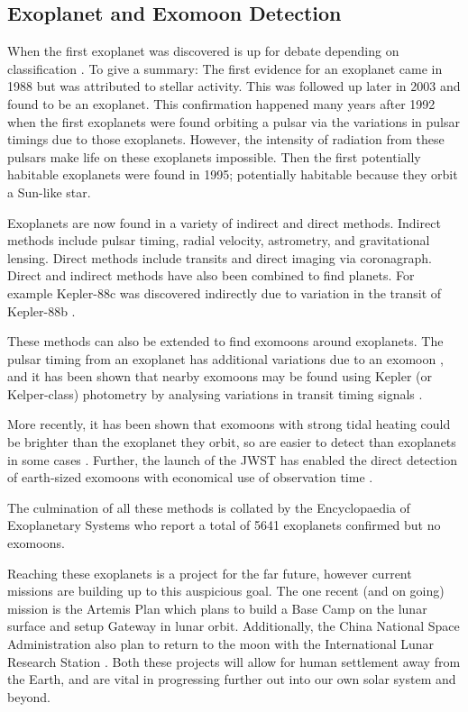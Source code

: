 \documentclass[12pt, onecolumn]{revtex4-2}    %
\begin{document}
\subsection{Exoplanet and Exomoon Detection} \label{ssec:ExoplanetExomoonDetection}
%
When the first exoplanet was discovered is up for debate depending on classification \cite{ESA_2019}.
To give a summary:
The first evidence for an exoplanet came in 1988 but was attributed to stellar activity.
This was followed up later in 2003 and found to be an exoplanet.
This confirmation happened many years after 1992 when the first exoplanets were found orbiting a pulsar via the variations in pulsar timings due to those exoplanets.
However, the intensity of radiation from these pulsars make life on these exoplanets impossible.
Then the first potentially habitable exoplanets were found in 1995; potentially habitable because they orbit a Sun-like star.

Exoplanets are now found in a variety of indirect and direct methods.
Indirect methods include pulsar timing, radial velocity, astrometry, and gravitational lensing.
Direct methods include transits and direct imaging via coronagraph.
Direct and indirect methods have also been combined to find planets. 
For example Kepler-88c was discovered indirectly due to variation in the transit of Kepler-88b \cite{Nesvorny2013}.

These methods can also be extended to find exomoons around exoplanets.
The pulsar timing from an exoplanet has additional variations due to an exomoon \cite{Lewis2008}, and it has been shown that nearby exomoons may be found using Kepler (or Kelper-class) photometry by analysing variations in transit timing signals \cite{KSG2009}.

More recently, it has been shown that exomoons with strong tidal heating could be brighter than the exoplanet they orbit, so are easier to detect than exoplanets in some cases \cite{LimTurn2013}.
Further, the launch of the JWST has enabled the direct detection of earth-sized exomoons with economical use of observation time \cite{Limbach2021}.

The culmination of all these methods is collated by the Encyclopaedia of Exoplanetary Systems \cite{ExoEu} who report a total of 5641 exoplanets confirmed but no exomoons.

Reaching these exoplanets is a project for the far future, however current missions are building up to this auspicious goal.
The one recent (and on going) mission is the Artemis Plan \cite{NASA_Artemis} which plans to build a Base Camp on the lunar surface and setup Gateway in lunar orbit.
Additionally, the China National Space Administration also plan to return to the moon with the International Lunar Research Station \cite{CNSA_ILRS}.
Both these projects will allow for human settlement away from the Earth, and are vital in progressing further out into our own solar system and beyond.
\end{document}

